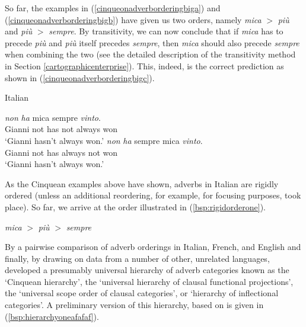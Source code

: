 \noindent So far, the examples in (\ref{cinqueonadverborderingbiga}) and (\ref{cinqueonadverborderingbigb}) have given us two orders, namely \textit{mica} $>$ \textit{più} and \textit{più} $>$ \textit{sempre}. By transitivity, we can now conclude that if \textit{mica} has to precede \textit{più} and \textit{più} itself precedes \textit{sempre}, then \textit{mica} should also precede \textit{sempre} when combining the two (see the detailed description of the transitivity method in Section \ref{cartographicenterprise}). This, indeed, is the correct prediction as shown in (\ref{cinqueonadverborderingbigc}).

\begin{exe} 
\ex Italian \citep[6]{cinque1999adverbs}\label{cinqueonadverborderingbigc} \begin{xlist} 
\ex {} {\textit{non}} {\textit{ha}} {mica} {sempre} {\textit{vinto}.}  \\
{Gianni} {not} {has} {not} {always} {won} \\
\trans `Gianni hasn't always won.' \label{cinqueonadverborderingca}
\ex \gll {} {\textit{non}} {\textit{ha}} {sempre} {mica} {\textit{vinto}.}  \\
{Gianni} {not} {has} {always} {not} {won} \\
\trans `Gianni hasn't always won.'  \label{cinqueonadverborderingcb}
\end{xlist} 
\end{exe}

\noindent As the Cinquean examples above have shown, adverbs in Italian are rigidly ordered (unless an additional reordering, for example, for focusing purposes, took place). So far, we arrive at the order illustrated in (\ref{bsp:rigidorderone}).


\begin{exe}
\ex\label{bsp:rigidorderone} 
\textit{mica} $>$ \textit{più} $>$ \textit{sempre}
\end{exe}

\noindent By a pairwise comparison of adverb orderings in Italian, French, and English and finally, by drawing on data from a number of other, unrelated languages, \citet{cinque1999adverbs} developed a presumably universal hierarchy of adverb categories known as the `Cinquean hierarchy', the `universal hierarchy of clausal functional projections', the `universal scope order of clausal categories', or `hierarchy of inflectional categories'. A preliminary version of this hierarchy, based on \citet[106]{cinque1999adverbs} is given in (\ref{bsp:hierarchyoneafafaf}).


